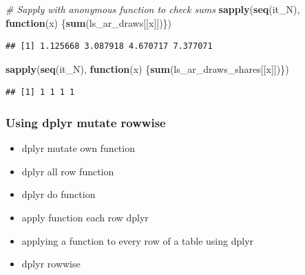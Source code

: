 \documentclass[
]{book}
\newenvironment{Shaded}{\begin{snugshade}}{\end{snugshade}}
\newcommand{\CommentTok}[1]{\textcolor[rgb]{0.56,0.35,0.01}{\textit{#1}}}
\newcommand{\ControlFlowTok}[1]{\textcolor[rgb]{0.13,0.29,0.53}{\textbf{#1}}}
\newcommand{\KeywordTok}[1]{\textcolor[rgb]{0.13,0.29,0.53}{\textbf{#1}}}
\newcommand{\NormalTok}[1]{#1}
\newcommand{\OperatorTok}[1]{\textcolor[rgb]{0.81,0.36,0.00}{\textbf{#1}}}
\newcommand{\StringTok}[1]{\textcolor[rgb]{0.31,0.60,0.02}{#1}}
\providecommand{\tightlist}{%
  \setlength{\itemsep}{0pt}\setlength{\parskip}{0pt}}
\begin{document}
\begin{Shaded}
\begin{Highlighting}[]
\CommentTok{# Sapply with anonymous function to check sums}
\KeywordTok{sapply}\NormalTok{(}\KeywordTok{seq}\NormalTok{(it_N), }\ControlFlowTok{function}\NormalTok{(x) \{}\KeywordTok{sum}\NormalTok{(ls_ar_draws[[x]])\})}
\end{Highlighting}
\end{Shaded}

\begin{verbatim}
## [1] 1.125668 3.087918 4.670717 7.377071
\end{verbatim}

\begin{Shaded}
\begin{Highlighting}[]
\KeywordTok{sapply}\NormalTok{(}\KeywordTok{seq}\NormalTok{(it_N), }\ControlFlowTok{function}\NormalTok{(x) \{}\KeywordTok{sum}\NormalTok{(ls_ar_draws_shares[[x]])\})}
\end{Highlighting}
\end{Shaded}

\begin{verbatim}
## [1] 1 1 1 1
\end{verbatim}

\hypertarget{using-dplyr-mutate-rowwise}{%
\subsubsection{Using dplyr mutate rowwise}\label{using-dplyr-mutate-rowwise}}

\begin{itemize}
\tightlist
\item
  dplyr mutate own function
\item
  dplyr all row function
\item
  dplyr do function
\item
  apply function each row dplyr
\item
  applying a function to every row of a table using dplyr
\item
  dplyr rowwise
\end{itemize}

\begin{Shaded}
\end{Shaded}
\end{document}
